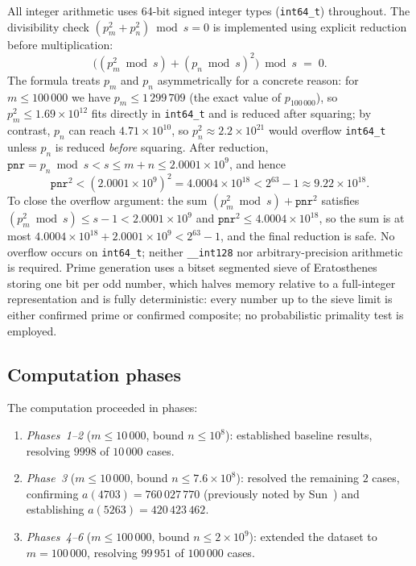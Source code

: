 \documentclass[12pt]{article}
\begin{document}
	All integer arithmetic uses 64-bit signed integer types
	(\texttt{int64\_t}) throughout.
	The divisibility check $(p_m^2 + p_n^2) \bmod s = 0$ is implemented
	using explicit reduction before multiplication:
	\[
	\bigl((p_m^2 \bmod s) + (p_n \bmod s)^2\bigr) \bmod s \;=\; 0.
	\]
	The formula treats $p_m$ and $p_n$ asymmetrically for a concrete
	reason: for $m \leq 100\,000$ we have $p_m \leq 1\,299\,709$
	(the exact value of $p_{100\,000}$),
	so $p_m^2 \leq 1.69 \times 10^{12}$ fits directly in \texttt{int64\_t}
	and is reduced after squaring; by contrast, $p_n$ can reach
	$4.71 \times 10^{10}$, so $p_n^2 \approx 2.2 \times 10^{21}$ would
	overflow \texttt{int64\_t} unless $p_n$ is reduced \emph{before}
	squaring.
	After reduction, $\mathtt{pnr} = p_n \bmod s < s \leq m + n \leq
	2.0001 \times 10^9$, and hence
	\[
	\mathtt{pnr}^2 < (2.0001 \times 10^9)^2
	= 4.0004 \times 10^{18}
	< 2^{63} - 1 \approx 9.22 \times 10^{18}.
	\]
	To close the overflow argument: the sum
	$(p_m^2 \bmod s) + \mathtt{pnr}^2$ satisfies
	$(p_m^2 \bmod s) \leq s - 1 < 2.0001 \times 10^9$
	and $\mathtt{pnr}^2 \leq 4.0004 \times 10^{18}$,
	so the sum is at most $4.0004 \times 10^{18} + 2.0001 \times 10^9
	< 2^{63} - 1$, and the final reduction is safe.
	No overflow occurs on \texttt{int64\_t}; neither \texttt{\_\_int128}
	nor arbitrary-precision arithmetic is required.
	Prime generation uses a bitset segmented sieve of Eratosthenes
	storing one bit per odd number, which halves memory relative to a
	full-integer representation and is fully deterministic: every number
	up to the sieve limit is either confirmed prime or confirmed composite;
	no probabilistic primality test is employed.
	
	\subsection{Computation phases}
	
	The computation proceeded in phases:
	\begin{enumerate}
		\item \emph{Phases~1--2} ($m \leq 10\,000$, bound $n \leq 10^8$):
		established baseline results, resolving $9998$ of $10\,000$ cases.
		\item \emph{Phase~3} ($m \leq 10\,000$,
		bound $n \leq 7.6 \times 10^8$):
		resolved the remaining $2$ cases, confirming
		$a(4703) = 760\,027\,770$ (previously noted by Sun~\cite{Sun2019})
		and establishing $a(5263) = 420\,423\,462$.
		\item \emph{Phases~4--6} ($m \leq 100\,000$,
		bound $n \leq 2 \times 10^9$):
		extended the dataset to $m = 100\,000$, resolving $99\,951$ of
		$100\,000$ cases.
	\end{enumerate}
	
\end{document}
